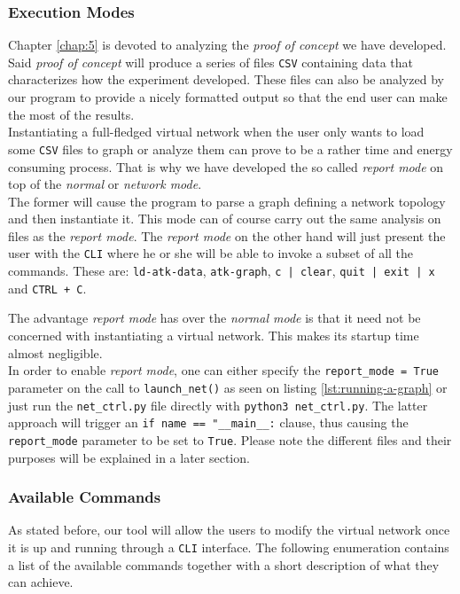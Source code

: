             \subsubsection{Execution Modes}
                Chapter \ref{chap:5} is devoted to analyzing the \textit{proof of concept} we have developed. Said \textit{proof of concept} will produce a series of files \texttt{CSV} containing data that characterizes how the experiment developed. These files can also be analyzed by our program to provide a nicely formatted output so that the end user can make the most of the results.\\

                Instantiating a full-fledged virtual network when the user only wants to load some \texttt{CSV} files to graph or analyze them can prove to be a rather time and energy consuming process. That is why we have developed the so called \textit{report mode} on top of the \textit{normal} or \textit{network mode}.\\

                The former will cause the program to parse a graph defining a network topology and then instantiate it. This mode can of course carry out the same analysis on files as the \textit{report mode}. The \textit{report mode} on the other hand will just present the user with the \texttt{CLI} where he or she will be able to invoke a subset of all the commands. These are: \texttt{ld-atk-data}, \texttt{atk-graph}, \texttt{c | clear}, \texttt{quit | exit | x} and \texttt{CTRL + C}.

                The advantage \textit{report mode} has over the \textit{normal mode} is that it need not be concerned with instantiating a virtual network. This makes its startup time almost negligible.\\

                In order to enable \textit{report mode}, one can either specify the \texttt{report\_mode = True} parameter on the call to \texttt{launch\_net()} as seen on listing \ref{lst:running-a-graph} or just run the \texttt{net\_ctrl.py} file directly with \texttt{python3 net\_ctrl.py}. The latter approach will trigger an \texttt{if name == "\_\_main\_\_:} clause, thus causing the \texttt{report\_mode} parameter to be set to \texttt{True}. Please note the different files and their purposes will be explained in a later section.\\

            \subsubsection{Available Commands}
                As stated before, our tool will allow the users to modify the virtual network once it is up and running through a \texttt{CLI} interface. The following enumeration contains a list of the available commands together with a short description of what they can achieve.\\

